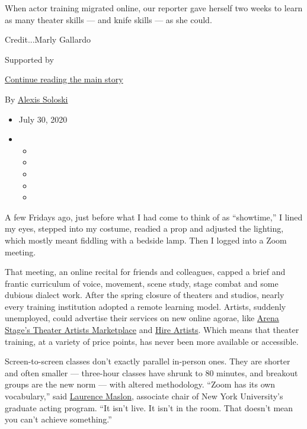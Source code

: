 When actor training migrated online, our reporter gave herself two weeks
to learn as many theater skills --- and knife skills --- as she could.

Credit...Marly Gallardo

Supported by

\protect\hyperlink{after-sponsor}{Continue reading the main story}

By \href{https://www.nytimes.com/by/alexis-soloski}{Alexis Soloski}

\begin{itemize}
\item
  July 30, 2020
\item
  \begin{itemize}
  \item
  \item
  \item
  \item
  \item
  \end{itemize}
\end{itemize}

A few Fridays ago, just before what I had come to think of as
``showtime,'' I lined my eyes, stepped into my costume, readied a prop
and adjusted the lighting, which mostly meant fiddling with a bedside
lamp. Then I logged into a Zoom meeting.

That meeting, an online recital for friends and colleagues, capped a
brief and frantic curriculum of voice, movement, scene study, stage
combat and some dubious dialect work. After the spring closure of
theaters and studios, nearly every training institution adopted a remote
learning model. Artists, suddenly unemployed, could advertise their
services on new online agorae, like
\href{https://www.arenastage.org/artistsmarketplace}{Arena Stage's
Theater Artists Marketplace} and \href{https://hireartists.org/}{Hire
Artists}. Which means that theater training, at a variety of price
points, has never been more available or accessible.

Screen-to-screen classes don't exactly parallel in-person ones. They are
shorter and often smaller --- three-hour classes have shrunk to 80
minutes, and breakout groups are the new norm --- with altered
methodology. ``Zoom has its own vocabulary,'' said
\href{https://tisch.nyu.edu/about/directory/grad-acting/102885218}{Laurence
Maslon}, associate chair of New York University's graduate acting
program. ``It isn't live. It isn't in the room. That doesn't mean you
can't achieve something.''

